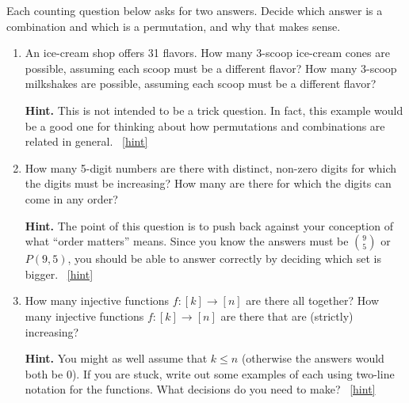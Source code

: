 \documentclass{book}
\begin{document}
\setcounter{project}{116}
\addtocounter{project}{-1}
\begin{activity}[]\label{activity-109}
\hypertarget{p-829}{}%
Each counting question below asks for two answers.  Decide which answer is a combination and which is a permutation, and why that makes sense.%
\begin{enumerate}[font=\bfseries,label=(\alph*),ref=\alph*]
\item\label{task-150} \hypertarget{p-830}{}%
An ice-cream shop offers 31 flavors.  How many 3-scoop ice-cream cones are possible, assuming each scoop must be a different flavor?  How many 3-scoop milkshakes are possible, assuming each scoop must be a different flavor?%
\par\smallskip%
\noindent\textbf{Hint.}\hypertarget{hint-73}{}\quad%
\hypertarget{p-831}{}%
This is not intended to be a trick question.  In fact, this example would be a good one for thinking about how permutations and combinations are related in general.%
~\hfill{\tiny\hyperlink{a-116.a}{[hint]}\hypertarget{q-116.a}{}}\item\label{task-151} \hypertarget{p-832}{}%
How many 5-digit numbers are there with distinct, non-zero digits for which the digits must be increasing?  How many are there for which the digits can come in any order?%
\par\smallskip%
\noindent\textbf{Hint.}\hypertarget{hint-74}{}\quad%
\hypertarget{p-833}{}%
The point of this question is to push back against your conception of what ``order matters'' means.  Since you know the answers must be \(\binom{9}{5}\) or \(P(9,5)\), you should be able to answer correctly by deciding which set is bigger.%
~\hfill{\tiny\hyperlink{a-116.b}{[hint]}\hypertarget{q-116.b}{}}\item\label{task-152} \hypertarget{p-834}{}%
How many injective functions \(f:[k] \to [n]\) are there all   together?  How many injective functions \(f:[k] \to [n]\) are there that are (strictly) increasing?%
\par\smallskip%
\noindent\textbf{Hint.}\hypertarget{hint-75}{}\quad%
\hypertarget{p-835}{}%
You might as well assume that \(k \le n\) (otherwise the answers would both be 0).  If you are stuck, write out some examples of each using two-line notation for the functions.  What decisions do you need to make?%
~\hfill{\tiny\hyperlink{a-116.c}{[hint]}\hypertarget{q-116.c}{}}\end{enumerate}
\end{activity}
\end{document}
